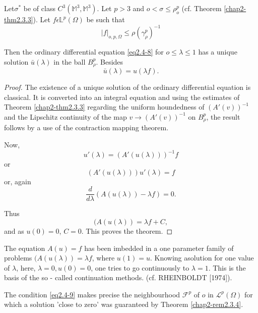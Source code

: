 \begin{theorem}\label{chap2-thm2.4.1}%
Let\pageoriginale $\sigma^*$ be of class $C^3(\mathbb{M}^3
  ,\mathbb{M}^3)$. Let $p > 3$ and $o < \sigma \le \rho^p_o$
  (cf. Theorem \ref{chap2-thm2.3.3}). Let
  $f \epsilon \mathbb{L}^p(\Omega)$ be such that   
  \begin{equation*}
    |f|_{o,p,\Omega} \le \rho (\gamma^p_\rho)^{-1} \tag{2.4-9}\label{eq2.4-9}
  \end{equation*}
\end{theorem}

Then the ordinary differential equation \eqref{eq2.4-8} for $o \le \lambda
\le 1$ has a unique solution $\bar{u}(\lambda)$ in the ball
$B^p_\rho$. Besides 
\begin{equation*}
  \bar{u}(\lambda) = u(\lambda f). \tag{2.4-10}\label{eq2.4-10}
\end{equation*}

\begin{proof}
  The existence of a unique solution of the ordinary differential
  equation is classical. It is converted into an integral equation and
  using the estimates of Theorem \ref{chap2-thm2.3.3} regarding the uniform
  houndedness of $(A'(v))^{-1}$ and the Lipschitz continuity of the
  map $v \rightarrow (A'(v))^{-1}$ on $B^p_\rho$, the result follows by
  a use of the contraction mapping theorem. 

Now,
$$
 u'(\lambda) = (A' (u(\lambda)))^{-1} f
$$
or
$$
(A' (u(\lambda))) u'(\lambda) = f 
$$
or, again
$$
\frac{d}{d \lambda} (A (u(\lambda)) - \lambda
 f ) = 0.
$$ 

 Thus 
 $$ 
 (A(u(\lambda)) = \lambda f + C, 
 $$
 and as $u(0) = 0$, $C =0$. This proves the theorem.
 \end{proof}

\begin{remark}\label{chap2-rem2.4.1}%
  The equation $A(u) = f$ has been imbedded in a one parameter family
  of problems $(A (u(\lambda)) = \lambda f$, where $u(1) = u$. Knowing
  a\pageoriginale solution for one value of $\lambda$, here, $\lambda
  = 0, u (0) = 0$, one tries to go continuously to $\lambda = 1$. This
  is the basis of the so - called continuation
  methods. (cf. RHEINBOLDT [1974]).  
\end{remark}

\begin{remark}\label{chap2-rem2.4.2}%
  The condition \eqref{eq2.4-9} makes precise the neighbourhood
  $\mathscr{F}^p$ of $o$ in $\mathscr{L}^p (\Omega)$ for which a
  solution 'close to zero' was guaranteed by
  Theorem \ref{chap2-rem2.3.4}. 
  \end{remark}

